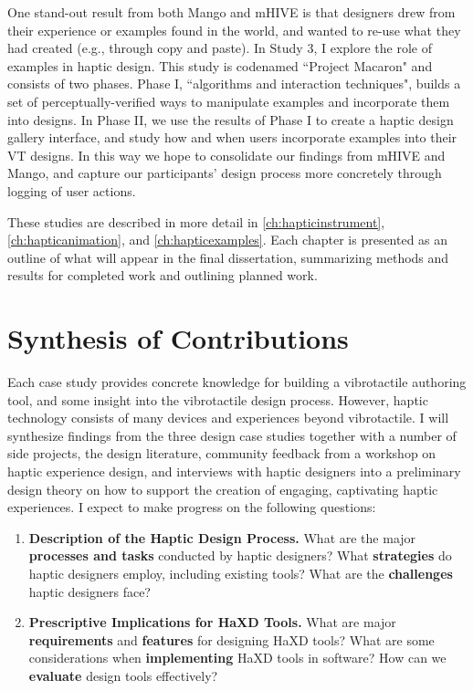 One stand-out result from both Mango and mHIVE is that designers drew from their experience or examples found in the world, and wanted to re-use what they had created (e.g., through copy and paste).
In Study 3, I explore the role of examples in haptic design.
This study is codenamed ``Project Macaron" and consists of two phases.
Phase I, ``algorithms and interaction techniques", builds a set of perceptually-verified ways to manipulate examples and incorporate them into designs.
In Phase II, we use the results of Phase I to create a haptic design gallery interface, and study how and when users incorporate examples into their VT designs.
In this way we hope to consolidate our findings from mHIVE and Mango, and capture our participants' design process more concretely through logging of user actions.

These studies are described in more detail in \autoref{ch:hapticinstrument},  \autoref{ch:hapticanimation}, and \autoref{ch:hapticexamples}.
Each chapter is presented as an outline of what will appear in the final dissertation, summarizing methods and results for completed work and outlining planned work.


\section{Synthesis of Contributions}

Each case study provides concrete knowledge for building a vibrotactile authoring tool, and some insight into the vibrotactile design process.
However, haptic technology consists of many devices and experiences beyond vibrotactile.
I will synthesize findings from the three design case studies together with a number of side projects, the design literature, community feedback from a workshop on haptic experience design, and interviews with haptic designers into a preliminary design theory on how to support the creation of engaging, captivating haptic experiences.
I expect to make progress on the following questions:
\begin{enumerate}
    \item \textbf{Description of the Haptic Design Process.}
    What are the major \textbf{processes and tasks} conducted by haptic designers?
    What \textbf{strategies} do haptic designers employ, including existing tools?
    What are the \textbf{challenges} haptic designers face?
    
    
    \item \textbf{Prescriptive Implications for HaXD Tools.}
    What are major \textbf{requirements} and \textbf{features} for designing HaXD tools?
    What are some considerations when \textbf{implementing} HaXD tools in software?
    How can we \textbf{evaluate} design tools effectively?
\end{enumerate}

